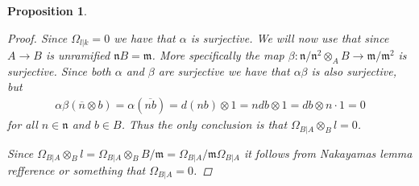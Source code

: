 \documentclass[11pt, a4paper, english]{article}
\newtheorem{prop}{Proposition}
\numberwithin{prop}{section}
\numberwithin{lemma}{section}
\numberwithin{theorem}{section}
\numberwithin{defin}{section}
\numberwithin{example}{section}
\begin{document}
\begin{prop}
\begin{proof}
Since $\Omega_{l|k}=0$ we have that $\alpha$ is surjective. We will now use that since $A \to B$ is unramified $\mathfrak{n}B = \mathfrak{m}$. More specifically the map $\beta: \mathfrak{n}/\mathfrak{n}^2 \otimes_A B \to \mathfrak{m}/\mathfrak{m}^2$ is surjective. Since both $\alpha$ and $\beta$ are surjective we have that $\alpha\beta$ is also surjective, but 
\begin{align*}
\alpha\beta(\overline{n} \otimes b) = \alpha(\overline{nb}) = d(nb) \otimes 1 = ndb \otimes 1 = db \otimes n \cdot 1 = 0
\end{align*}
for all $n \in \mathfrak{n}$ and $b \in B$. Thus the only conclusion is that $\Omega_{B|A} \otimes_B l = 0$.

Since $\Omega_{B|A} \otimes_B l = \Omega_{B|A} \otimes_B B/\mathfrak{m} = \Omega_{B|A}/\mathfrak{m}\Omega_{B|A}$ it follows from Nakayamas lemma {\color{red} refference or something} that $\Omega_{B|A}=0$.
\end{proof}
\end{prop}
\end{document}

